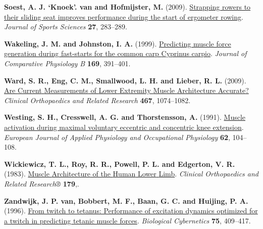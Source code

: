 \documentclass[
  11pt,
  a4paper]{article}
\newlength{\cslhangindent}
\newenvironment{CSLReferences}[2] %
 {\begin{list}{}{%
  \setlength{\itemindent}{0pt}
  \setlength{\leftmargin}{0pt}
  \setlength{\parsep}{0pt}
  \ifodd #1
   \setlength{\leftmargin}{\cslhangindent}
   \setlength{\itemindent}{-1\cslhangindent}
  \fi
  \setlength{\itemsep}{#2\baselineskip}}}
 {\end{list}}
\begin{document}
\begin{CSLReferences}{1}{1}
\textbf{Soest, A. J. `Knoek'. van and Hofmijster, M.} (2009).
\href{https://doi.org/10.1080/02640410802495336}{Strapping rowers to
their sliding seat improves performance during the start of ergometer
rowing}. \emph{Journal of Sports Sciences} \textbf{27}, 283--289.

\textbf{Wakeling, J. M. and Johnston, I. A.} (1999).
\href{https://doi.org/10.1007/s003600050235}{Predicting muscle force
generation during fast-starts for the common carp {Cyprinus} carpio}.
\emph{Journal of Comparative Physiology B} \textbf{169}, 391--401.

\textbf{Ward, S. R., Eng, C. M., Smallwood, L. H. and Lieber, R. L.}
(2009). \href{https://doi.org/10.1007/s11999-008-0594-8}{Are {Current}
{Measurements} of {Lower} {Extremity} {Muscle} {Architecture}
{Accurate}?} \emph{Clinical Orthopaedics and Related Research}
\textbf{467}, 1074--1082.

\textbf{Westing, S. H., Cresswell, A. G. and Thorstensson, A.} (1991).
\href{https://doi.org/10.1007/BF00626764}{Muscle activation during
maximal voluntary eccentric and concentric knee extension}.
\emph{European Journal of Applied Physiology and Occupational
Physiology} \textbf{62}, 104--108.

\textbf{Wickiewicz, T. L., Roy, R. R., Powell, P. L. and Edgerton, V.
R.} (1983).
\href{https://journals.lww.com/clinorthop/fulltext/1983/10000/muscle_architecture_of_the_human_lower_limb.42.aspx}{Muscle
{Architecture} of the {Human} {Lower} {Limb}}. \emph{Clinical
Orthopaedics and Related Research®} \textbf{179},.

\textbf{Zandwijk, J. P. van, Bobbert, M. F., Baan, G. C. and Huijing, P.
A.} (1996). \href{https://doi.org/10.1007/s004220050306}{From twitch to
tetanus: Performance of excitation dynamics optimized for a twitch in
predicting tetanic muscle forces}. \emph{Biological Cybernetics}
\textbf{75}, 409--417.

\end{CSLReferences}
\end{document}
